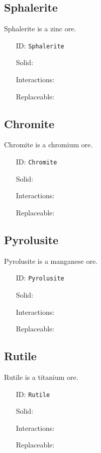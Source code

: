 \subsection{Sphalerite}\label{subsec:blocks_sphalerite}
Sphalerite is a zinc ore.
\newline
\begin{itemize}[nosep]
\item[ID:] \texttt{Sphalerite}
\item[Solid:]  \Checkmark \item[Interactions:]  \XSolidBrush \item[Replaceable:]  \XSolidBrush \end{itemize}

\subsection{Chromite}\label{subsec:blocks_chromite}
Chromite is a chromium ore.
\newline
\begin{itemize}[nosep]
\item[ID:] \texttt{Chromite}
\item[Solid:]  \Checkmark \item[Interactions:]  \XSolidBrush \item[Replaceable:]  \XSolidBrush \end{itemize}

\subsection{Pyrolusite}\label{subsec:blocks_pyrolusite}
Pyrolusite is a manganese ore.
\newline
\begin{itemize}[nosep]
\item[ID:] \texttt{Pyrolusite}
\item[Solid:]  \Checkmark \item[Interactions:]  \XSolidBrush \item[Replaceable:]  \XSolidBrush \end{itemize}

\subsection{Rutile}\label{subsec:blocks_rutile}
Rutile is a titanium ore.
\newline
\begin{itemize}[nosep]
\item[ID:] \texttt{Rutile}
\item[Solid:]  \Checkmark \item[Interactions:]  \XSolidBrush \item[Replaceable:]  \XSolidBrush \end{itemize}

